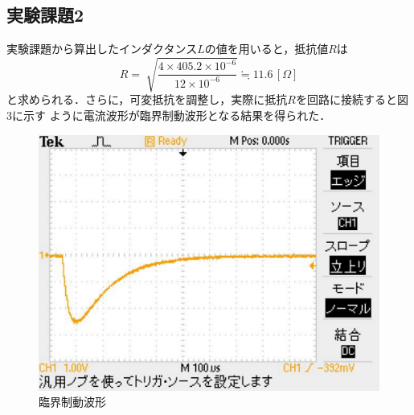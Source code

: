\subsection{実験課題2}
実験課題から算出したインダクタンス$L$の値を用いると，抵抗値$R$は
$$
R=\sqrt[]{\frac{4\times 405.2\times10^{-6}}{12\times10^{-6}}}\fallingdotseq 11.6\,[\Omega]
$$
と求められる．さらに，可変抵抗を調整し，実際に抵抗$R$を回路に接続すると図3に示す
ように電流波形が臨界制動波形となる結果を得られた．
\begin{figure}[H]
    \begin{center}
        \includegraphics[scale=0.5]{figure3.pdf}
        \caption{臨界制動波形}
    \end{center}
\end{figure}